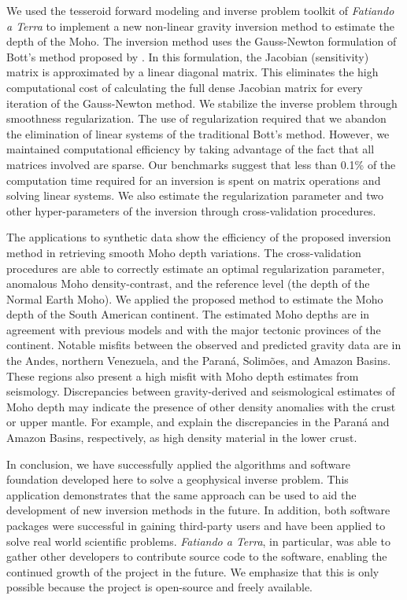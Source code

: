 We used the tesseroid forward modeling and inverse problem toolkit of
\textit{Fatiando a Terra} to implement a new non-linear gravity inversion
method to estimate the depth of the Moho.
The inversion method uses the Gauss-Newton formulation of Bott's method
proposed by \citet{silva2014}.
In this formulation, the Jacobian (sensitivity) matrix is approximated by a
linear diagonal matrix.
This eliminates the high computational cost of calculating the full dense
Jacobian matrix for every iteration of the Gauss-Newton method.
We stabilize the inverse problem through smoothness regularization.
The use of regularization required that we abandon the elimination of linear
systems of the traditional Bott's method.
However, we maintained computational efficiency by taking advantage of the fact
that all matrices involved are sparse.
Our benchmarks suggest that less than 0.1\% of the computation time required
for an inversion is spent on matrix operations and solving linear systems.
We also estimate the regularization parameter and two other hyper-parameters of
the inversion through cross-validation procedures.

The applications to synthetic data show the
efficiency of the proposed inversion method in retrieving smooth Moho depth
variations.
The cross-validation procedures are able to correctly estimate an optimal
regularization parameter, anomalous Moho density-contrast, and the reference
level (the depth of the Normal Earth Moho).
We applied the proposed method to estimate the Moho depth of the South American
continent.
The estimated Moho depths are in agreement with previous models and with the
major tectonic provinces of the continent.
Notable misfits between the observed and predicted gravity data are in the
Andes, northern Venezuela, and the Paraná, Solimões, and Amazon Basins.
These regions also present a high misfit with Moho depth estimates from
seismology.
Discrepancies between gravity-derived and seismological estimates of Moho depth
may indicate the presence of other density anomalies with the crust or upper
mantle.
For example, \citet{mariani2013} and \citet{nunn1988} explain the discrepancies
in the Paraná and Amazon Basins, respectively, as high density material in the
lower crust.

In conclusion,
we have successfully applied the algorithms and software foundation developed
here to solve a geophysical inverse problem.
This application demonstrates that the same approach can be used to aid the
development of new inversion methods in the future.
In addition, both software packages were successful in gaining third-party
users and have been applied to solve real world scientific problems.
\textit{Fatiando a Terra}, in particular, was able to gather other developers
to contribute source code to the software, enabling the continued growth of the
project in the future.
We emphasize that this is only possible because the project is open-source and
freely available.
